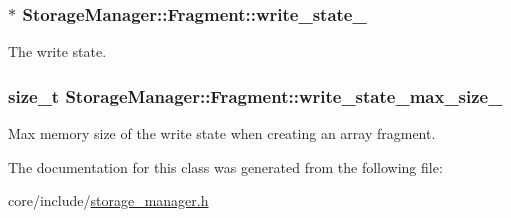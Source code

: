 \subsubsection[{write\+\_\+state\+\_\+}]{$\ast$ Storage\+Manager\+::\+Fragment\+::write\+\_\+state\+\_\+\hspace{0.3cm}{\ttfamily [private]}}\label{classStorageManager_1_1Fragment_a575fde194ea2e0f1eaff4c939da801ff}
The write state. \hypertarget{classStorageManager_1_1Fragment_ae91602363a194e997a36ba34a709431c}{}
\subsubsection[{write\+\_\+state\+\_\+max\+\_\+size\+\_\+}]{\setlength{\rightskip}{0pt plus 5cm}size\+\_\+t Storage\+Manager\+::\+Fragment\+::write\+\_\+state\+\_\+max\+\_\+size\+\_\+\hspace{0.3cm}{\ttfamily [private]}}\label{classStorageManager_1_1Fragment_ae91602363a194e997a36ba34a709431c}
Max memory size of the write state when creating an array fragment. 

The documentation for this class was generated from the following file\+:\begin{DoxyCompactItemize}
\item 
core/include/\hyperlink{storage__manager_8h}{storage\+\_\+manager.\+h}\end{DoxyCompactItemize}
